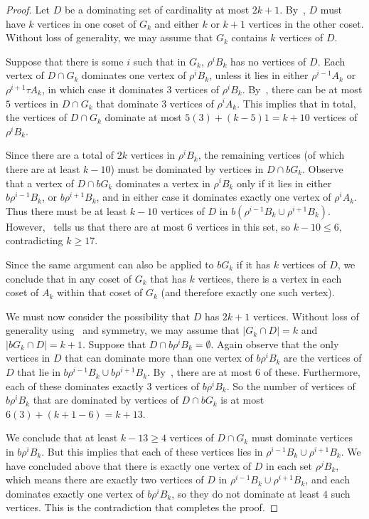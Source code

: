 \documentclass{amsart}
\theoremstyle{remark}
\theoremstyle{definition}
\begin{document}
\begin{proof}
    Let $D$ be a dominating set of cardinality at most $2k+1$. By~, $D$ must have $k$ vertices in one coset of $G_k$ and either $k$ or $k+1$ vertices in the other coset. Without loss of generality, we may assume that $G_k$ contains $k$ vertices of $D$.

    Suppose that there is some $i$ such that in $G_k$, $\rho^iB_k$ has no vertices of $D$. Each vertex of $D \cap G_k$ dominates one vertex of $\rho^iB_k$, unless it lies in either $\rho^{i-1}A_k$ or $\rho^{i+1}\tau A_k$, in which case it dominates $3$ vertices of $\rho^iB_k$. By~, there can be at most $5$ vertices in $D\cap G_k$ that dominate $3$ vertices of $\rho^i A_k$. This implies that in total, the vertices of $D\cap G_k$ dominate at most $5(3)+(k-5)1=k+10$ vertices of $\rho^iB_k$.
    
    Since there are a total of $2k$ vertices in $\rho^iB_k$, the remaining vertices (of which there are at least $k-10$) must be dominated by vertices in $D \cap bG_k$. Observe that a vertex of $D\cap bG_k$ dominates a vertex in $\rho^iB_k$ only if it lies in either $b\rho^{i-1}B_k$, or $b\rho^{i+1}B_k$, and in either case it dominates exactly one vertex of $\rho^i A_k$. Thus there must be at least $k-10$ vertices of $D$ in $b(\rho^{i-1}B_k\cup \rho^{i+1}B_k)$. However,~ tells us that there are at most $6$ vertices in this set, so $k-10\le 6$, contradicting $k \ge 17$.

    Since the same argument can also be applied to $bG_k$ if it has $k$ vertices of $D$, we conclude that in any coset of $G_k$ that has $k$ vertices, there is a vertex in each coset of $A_k$ within that coset of $G_k$ (and therefore exactly one such vertex).

    We must now consider the possibility that $D$ has $2k+1$ vertices. Without loss of generality using~ and symmetry, we may assume that $|G_k \cap D|=k$ and $|bG_k\cap D|=k+1$. Suppose that $D\cap b\rho^iB_k=\emptyset$. 
    Again observe that the only vertices in $D$ that can dominate more than one vertex of $b\rho^iB_k$ are the vertices of $D$ that lie in $b\rho^{i-1}B_k\cup b\rho^{i+1}B_k$. By~, there are at most $6$ of these. Furthermore, each of these dominates exactly $3$ vertices of $b\rho^iB_k$. So the number of vertices of $b\rho^iB_k$ that are dominated by vertices of $D \cap bG_k$ is at most $6(3)+(k+1-6)=k+13$. 

 We conclude that at least $k-13 \ge 4$ vertices of $D\cap G_k$ must dominate vertices in $b\rho^iB_k$. But this implies that each of these vertices lies in $\rho^{i-1}B_k\cup \rho^{i+1}B_k$. We have concluded above that there is exactly one vertex of $D$ in each set $\rho^jB_k$, which means there are exactly two vertices of $D$ in $\rho^{i-1}B_k\cup \rho^{i+1}B_k$, and each dominates exactly one vertex of $b\rho^iB_k$, so they do not dominate at least $4$ such vertices. This is the contradiction that completes the proof.
\end{proof}
\end{document}
